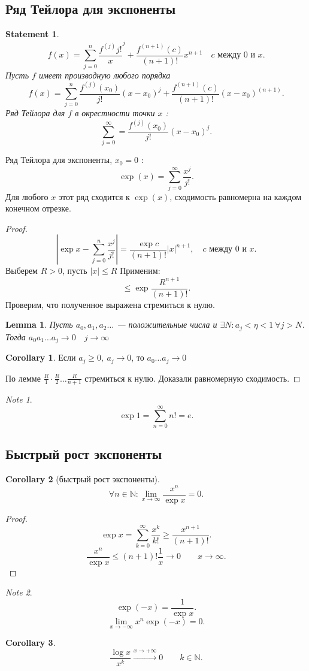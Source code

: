 \documentclass[11pt]{book}
\newcommand{\N}{\mathbb{N}}
\renewcommand{\le}{\leqslant}
\renewcommand{\ge}{\geqslant}
\theoremstyle{definition}
\theoremstyle{plain}
\theoremstyle{plain}
\newtheorem*{lm}{Lemma}
\newtheorem*{st}{Statement}
\theoremstyle{definition}
\newtheorem*{cor}{Corollary}
\theoremstyle{remark}
\newtheorem*{note}{Note}
\begin{document}
\subsection{Ряд Тейлора для экспоненты}
\begin{st}
    \[
	f(x) = \sum_{j= 0}^{n} \frac{f^{(j)}{j!}}x ^{j} + \frac{f^{(n+1)}(c)}{(n+1)!} x^{n+1} \quad c \text{ между } 0 \text{ и } x
    .\]
    Пусть $ f$ имеет производную любого порядка
    \[
	f(x) = \sum_{j=0} ^{n} \frac{f^{(j)} (x_0)}{j!} (x-x_0)^{j} + \frac{f^{(n+1)}(c) }{(n+1)!} (x-x_0) ^{(n+1)}
    .\]
    Ряд Тейлора для $ f$ в окрестности точки $ x$ :
    \[
	\sum_{j=0}^{\infty} = \frac{f^{(j)} (x_0)}{j!} (x-x_0)^{j}
    .\]
\end{st}
\begin{thm}
    Ряд Тейлора для экспоненты, $ x_0 = 0$ :
    \[
	\exp(x) = \sum_{j=0}^{\infty} \frac{x^{j}}{j!}
    .\]
    Для любого $ x$ этот ряд сходится к $ \exp(x)$, сходимость равномерна на каждом конечном отрезке.
\end{thm}
\begin{proof}
    \[
	\left| \exp x - \sum_{j=0}^{n} \frac{x^{j}}{j!}   \right| = \frac{\exp c}{(n+1)!}|x|^{n+1}, \quad c  \text{ между } 0  \text{ и } x
    .\]
    Выберем $ R >0$, пусть $ |x| \le R$
    Применим:
    \[
	\le  \exp \frac{R ^{n+1}}{(n+1)!}
    .\]
    Проверим, что полученное выражена стремиться к нулю.
    \begin{lm}
	Пусть $ a_0, a_1, a_2 \ldots  $ --- положительные числа и $
	\exists N: a_j < \eta < 1 ~ \forall  j > N
	$.
	Тогда $ a_0 a_1 \ldots a_j \to  0 \quad j \to \infty$
    \end{lm}
    \begin{cor}
	Если $ a_j \ge  0, ~ a_j \to  0$, то $ a_0 \ldots a_j \to 0$
    \end{cor}
    По лемме $ \frac{R}{1} \cdot \frac{R}{2} \ldots  \frac{R}{n+1}$ стремиться к нулю. Доказали равномерную сходимость.
\end{proof}
\begin{note}
    \[
	\exp 1 = \sum_{n=0}^{\infty} n! = e
    .\]
\end{note}
\subsection{Быстрый рост экспоненты}
\begin{cor}[быстрый рост экспоненты]
    \[
	\forall n \in  \N : \lim_{x \to  \infty}  \frac{x^{n}}{\exp x} = 0
    .\]
\end{cor}
\begin{proof}
    \[
	\exp x = \sum_{k =0}^{\infty} \frac{x^{k}}{k!}\ge  \frac{x^{n+1}}{(n+1)!}
    .\]
    \[
	\frac{x^{n}}{\exp x} \le  (n+1)! \frac{1}{x} \longrightarrow 0 \qquad x \to  \infty
    .\]
\end{proof}
\begin{note}
    \[
	\exp(-x) = \frac{1}{\exp x}
    .\]
    \[
	\lim_{x \to  -\infty}  x^{n} \exp (-x) = 0
    .\]
\end{note}
\begin{cor}
    \[
	\frac{\log x}{x^{k}} \stackrel{ x \to  + \infty}{\longrightarrow} 0 \qquad k \in  \N
    .\]
\end{cor}
\end{document}
